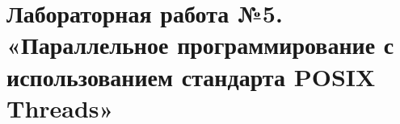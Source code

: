 { %
	\section{Лабораторная работа №5. «Параллельное программирование с использованием стандарта POSIX Threads»}
	
	
	
}
